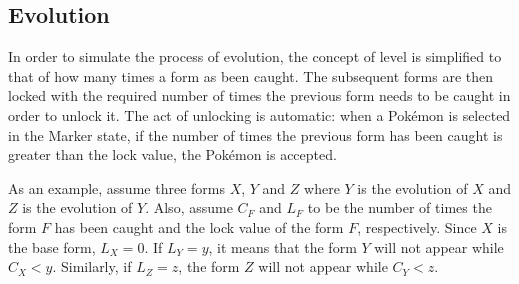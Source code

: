 \subsection{Evolution}
\label{sec:evolution}

In order to simulate the process of evolution, the concept of level is simplified to that of how many times a form as been caught. The subsequent forms are then locked with the required number of times the previous form needs to be caught in order to unlock it. The act of unlocking is automatic: when a Pokémon is selected in the Marker state, if the number of times the previous form has been caught is greater than the lock value, the Pokémon is accepted.

As an example, assume three forms $X$, $Y$ and $Z$ where $Y$ is the evolution of $X$ and $Z$ is the evolution of $Y$. Also, assume $C_{F}$ and $L_{F}$ to be the number of times the form $F$ has been caught and the lock value of the form $F$, respectively. Since $X$ is the base form, $L_{X}=0$. If $L_{Y}=y$, it means that the form $Y$ will not appear while $C_{X}<y$. Similarly, if $L_{Z}=z$, the form $Z$ will not appear while $C_{Y}<z$.